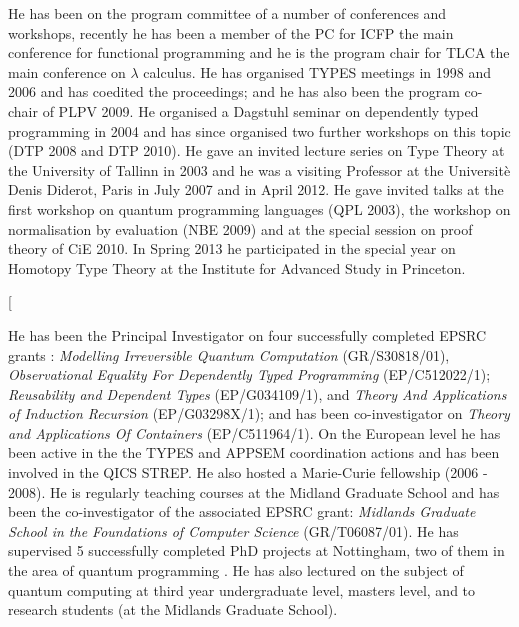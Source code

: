\documentclass[a4paper]{article}
\begin{document}
He has been on the program committee of a number of conferences and
workshops, recently he has been a member of the PC for ICFP the main
conference for functional programming and he is the program chair for
TLCA the main conference on $\lambda$ calculus.  He has organised
TYPES meetings in 1998 and 2006 and has coedited the proceedings; and
he has also been the program co-chair of PLPV 2009.  He organised a
Dagstuhl seminar on dependently typed programming in 2004 and has
since organised two further workshops on this topic (DTP 2008 and DTP
2010). He gave an invited lecture series on Type Theory at the
University of Tallinn in 2003 and he was a visiting Professor at the
Universit\`{e} Denis Diderot, Paris in July 2007 and in April 2012. He
gave invited talks at the first workshop on quantum programming
languages (QPL 2003), the workshop on normalisation by evaluation (NBE
2009) and at the special session on proof theory of CiE 2010. In
Spring 2013 he participated in the special year on Homotopy Type
Theory at the Institute for Advanced Study in Princeton.

\twocolumn[

He has been the Principal Investigator on four successfully completed
EPSRC grants : \emph{Modelling Irreversible Quantum Computation}
(GR/S30818/01), \emph{Observational Equality For Dependently Typed
  Programming} (EP/C512022/1); \emph{Reusability and Dependent Types} (EP/G034109/1), 
and 
\emph{Theory And Applications of Induction
  Recursion} (EP/G03298X/1); and has been co-investigator on
\emph{Theory and Applications Of Containers} (EP/C511964/1). 
On the European level he has been active in the the
TYPES and APPSEM coordination actions and has been involved in the
QICS STREP. He also hosted a Marie-Curie fellowship (2006 - 2008). He
is regularly teaching courses at the Midland Graduate School and has
been the co-investigator of the associated EPSRC grant: \emph{Midlands
  Graduate School in the Foundations of Computer Science}
(GR/T06087/01). He has supervised 5 successfully completed PhD
projects at Nottingham, two of them in the area of quantum
programming . He has also lectured 
on the subject of quantum computing at third year
undergraduate level, masters level, and to research students 
(at the Midlands Graduate School).
\end{document}
